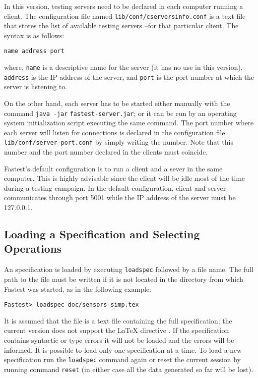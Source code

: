 In this version, testing servers need to be declared in each computer running a client. The configuration file named \verb+lib/conf/cserversinfo.conf+ is a text file that stores the list of available testing servers --for that particular client. The syntax is as follows: 

\begin{verbatim}
name address port
\end{verbatim}

\noindent where, \verb+name+ is a descriptive name for the server (it has no use in this version), \verb+address+ is the IP address of the server, and \verb+port+ is the port number at which the server is listening to.

On the other hand, each server has to be started either manually with the command \verb+java -jar+ \verb+fastest-server.jar+; or it can be run by an operating system initialization script executing the same command. The port number where each server will listen for connections is declared in the configuration file \verb+lib/conf/server-port.conf+ by simply writing the number. Note that this number and the port number declared in the clients must coincide.

Fastest's default configuration is to run a client and a sever in the same computer. This is highly advisable since the client will be idle most of the time during a testing campaign. In the default configuration, client and server communicates through port 5001 while the IP address of the server must be 127.0.0.1.
 

\subsection{\label{leso}Loading a Specification and Selecting Operations}

An specification is loaded by executing \verb+loadspec+ followed by a file name. The full path to the file must be written if it is not located in the directory from which Fastest was started, as in the following example:

\begin{verbatim}
Fastest> loadspec doc/sensors-simp.tex
\end{verbatim}

It is assumed that the file is a text file containing the full specification; the current version does not support the \LaTeX{} directive \verb++. If the specification contains syntactic or type errors it will not be loaded and the errors will be informed. It is possible to load only one specification at a time. To load a new specification run the \verb+loadspec+ command again or reset the current session by running command \verb+reset+ (in either case all the data generated so far will be lost). 

